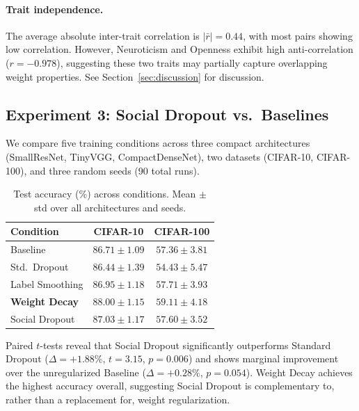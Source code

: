 \documentclass[letterpaper]{article}
\begin{document}
\paragraph{Trait independence.} The average absolute inter-trait correlation is $|\bar{r}|=0.44$, with most pairs showing low correlation. However, Neuroticism and Openness exhibit high anti-correlation ($r=-0.978$), suggesting these two traits may partially capture overlapping weight properties. See Section~\ref{sec:discussion} for discussion.

\subsection{Experiment 3: Social Dropout vs.\ Baselines}

We compare five training conditions across three compact architectures (SmallResNet, TinyVGG, CompactDenseNet), two datasets (CIFAR-10, CIFAR-100), and three random seeds (90 total runs).

\begin{table}[H]
\centering
\caption{Test accuracy (\%) across conditions. Mean $\pm$ std over all architectures and seeds.}
\label{tab:accuracy}
\small
\begin{tabular}{lcc}
\toprule
Condition & CIFAR-10 & CIFAR-100 \\
\midrule
Baseline         & $86.71 \pm 1.09$ & $57.36 \pm 3.81$ \\
Std.~Dropout     & $86.44 \pm 1.39$ & $54.43 \pm 5.47$ \\
Label Smoothing  & $86.95 \pm 1.18$ & $57.71 \pm 3.93$ \\
\textbf{Weight Decay}     & $\mathbf{88.00 \pm 1.15}$ & $\mathbf{59.11 \pm 4.18}$ \\
Social Dropout   & $87.03 \pm 1.17$ & $57.60 \pm 3.52$ \\
\bottomrule
\end{tabular}
\end{table}

Paired $t$-tests reveal that Social Dropout significantly outperforms Standard Dropout ($\Delta=+1.88\%$, $t=3.15$, $p=0.006$) and shows marginal improvement over the unregularized Baseline ($\Delta=+0.28\%$, $p=0.054$). Weight Decay achieves the highest accuracy overall, suggesting Social Dropout is complementary to, rather than a replacement for, weight regularization.
\end{document}
